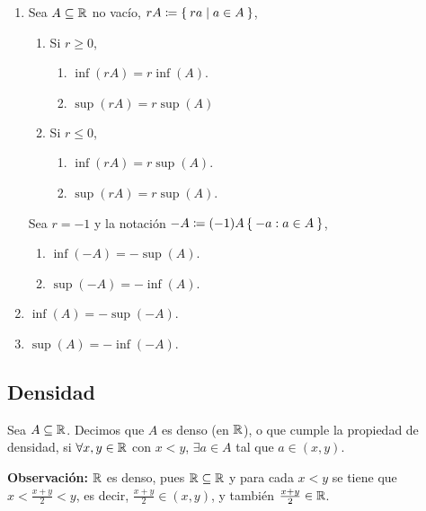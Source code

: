 \begin{enumerate}[label=\alph*)]
  \item Sea $A\subseteq \mathbb{R}$ no vacío, $rA \coloneqq \Set{r a| a\in A}$,
  \begin{enumerate}[label=\Roman*)]
    \item Si $r\geq 0$,
    \begin{enumerate}[label=\roman*)]
      \item $\inf(r A) = r\inf(A)$.
      \item $\sup(r A) = r\sup(A)$
    \end{enumerate}
    \item Si $r\leq 0$,
    \begin{enumerate}[label=\roman*)]
      \item $\inf(rA)=r\sup(A)$.
      \item $\sup(rA)=r\sup(A)$.
    \end{enumerate}
  \end{enumerate}
   Sea $r=-1$ y la notación $-A\coloneqq (-1)A\Set{-a:a\in A}$,
  \begin{enumerate}[label=\roman*)]
  \item $\inf(-A) = -\sup(A)$.
  \item $\sup(-A) = -\inf(A)$.
  \end{enumerate}
  
  \item $\inf(A)=-\sup(-A)$.
  \item $\sup(A)=-\inf(-A)$.
  
\end{enumerate}

\subsection*{Densidad}

 Sea $A\subseteq \mathbb{R}$. Decimos que $A$ es denso (en $\mathbb{R}$), o que cumple la propiedad de densidad, si $\forall x,y \in \mathbb{R}$ con $x<y$, $\exists a\in A$ tal que $a\in (x, y)$.

\textbf{Observación:} $\mathbb{R}$ es denso, pues $\mathbb{R}\subseteq \mathbb{R}$ y para cada $x<y$ se tiene que $x<\frac{x+y}{2}<y$, es decir, $\frac{x+y}{2}\in (x, y)$, y también $\frac{x+y}{2}\in \mathbb{R}$.